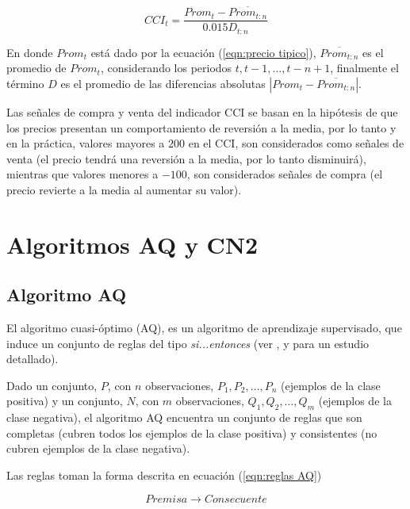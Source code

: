 \documentclass[12pt]{report}
\theoremstyle{break}
\theoremstyle{break}
\begin{document}
\begin{equation} \label{eqn:CCI}
CCI_t = \dfrac{ Prom_t - \overline{Prom_{t:n}} }{ 0.015 D_{t:n}}
\end{equation}

En donde $Prom_t$ está dado por la ecuación (\ref{eqn:precio tipico}), $\overline{Prom_{t:n}}$ es el promedio de $Prom_t$, considerando los periodos $t, t-1, \ldots, t-n +1$, finalmente el término $D$ es el promedio de las diferencias absolutas $\left|Prom_t - \overline{Prom_{t:n}}  \right|$.

Las señales de compra y venta del indicador CCI se basan en la hipótesis de que los precios presentan un comportamiento de reversión a la media, por lo tanto y en la práctica, valores mayores a $200$ en el CCI, son considerados como señales de venta (el precio tendrá una reversión a la media, por lo tanto disminuirá), mientras que valores menores a $-100$, son considerados señales de compra (el precio revierte a la media al aumentar su valor).

\section{Algoritmos AQ y CN2}
\label{seccion:algoritmos aq cn2}

\subsection{Algoritmo AQ}
\label{subseccion:algoritmo aq}
El algoritmo cuasi-óptimo (AQ), es un algoritmo de aprendizaje supervisado, que induce un conjunto de reglas del tipo \textit{si...entonces} (ver \cite{AQCervone2010}, \cite{AQMichalski1991} y \cite{AQWojtusiak2012} para un estudio detallado). 

Dado un conjunto, $P$, con $n$ observaciones, $P_1, P_2, \ldots, P_n$ (ejemplos de la clase positiva)  y un conjunto, $N$, con $m$ observaciones, $Q_1, Q_2, \ldots, Q_m$ (ejemplos de la clase negativa), el algoritmo AQ encuentra un conjunto de reglas que son completas (cubren todos los ejemplos de la clase positiva) y consistentes (no cubren ejemplos de la clase negativa).

Las reglas toman la forma descrita en ecuación (\ref{eqn:reglas AQ})

\begin{equation} \label{eqn:reglas AQ}
Premisa \rightarrow Consecuente
\end{equation}
\end{document}
